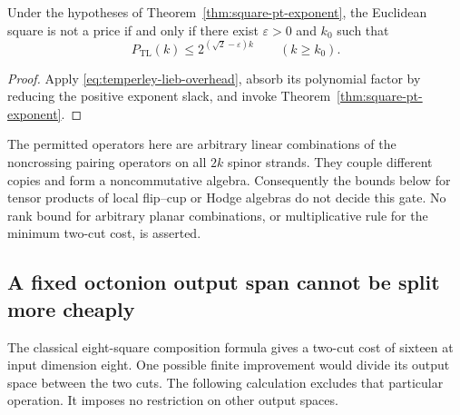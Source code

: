 \begin{corollary}
\label{cor:temperley-lieb-price-gate}
Under the hypotheses of Theorem~\ref{thm:square-pt-exponent},
the Euclidean square is not a price if and only if there exist
$\varepsilon>0$ and $k_0$ such that
\[
 P_{\mathrm{TL}}(k)\le2^{(\sqrt2-\varepsilon)k}
 \qquad(k\ge k_0).
\]
\end{corollary}

\begin{proof}
Apply \eqref{eq:temperley-lieb-overhead}, absorb its polynomial
factor by reducing the positive exponent slack, and invoke
Theorem~\ref{thm:square-pt-exponent}.
\end{proof}

The permitted operators here are arbitrary linear combinations
of the noncrossing pairing operators on all $2k$ spinor strands.
They couple different copies and form a noncommutative algebra.
Consequently the bounds below for tensor products of local
flip--cup or Hodge algebras do not decide this gate. No rank bound
for arbitrary planar combinations, or multiplicative rule for
the minimum two-cut cost, is asserted.

\subsection{A fixed octonion output span cannot be split more cheaply}

The classical eight-square composition formula gives a two-cut
cost of sixteen at input dimension eight. One possible finite
improvement would divide its output space between the two cuts.
The following calculation excludes that particular operation.
It imposes no restriction on other output spaces.

